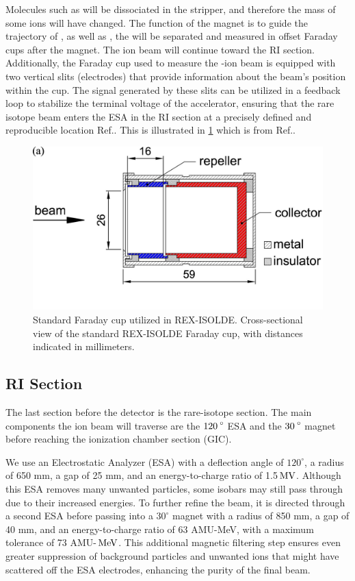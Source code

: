 Molecules such as  will be dissociated in the stripper, and therefore the mass of some ions will have changed. The function of the magnet is to guide the trajectory of , as well as , the  will be separated and measured in offset Faraday cups after the magnet. 
The ion beam will continue toward the RI section. Additionally, the Faraday cup used to measure the -ion beam is equipped with two vertical slits (electrodes) that provide information about the beam's position within the cup. The signal generated by these slits can be utilized in a feedback loop to stabilize the terminal voltage of the accelerator, ensuring that the rare isotope beam enters the ESA in the RI section at a precisely defined and reproducible location Ref.\cite{HVEE2013}. This is illustrated in \cref{faradaycupslits} which is from Ref.\cite{Kovalchuk2015}.

\begin{figure}[ht]
    \centering
    \includegraphics[width=\linewidth]{B/FCCERN.pdf}
    \caption{Standard Faraday cup utilized in REX-ISOLDE. Cross-sectional view of the standard REX-ISOLDE Faraday cup, with distances indicated in millimeters.}
    \label{faradaycupslits}
\end{figure}


\subsection{RI Section}
The last section before the detector is the rare-isotope section. The main components the ion beam will traverse are the $\ce{120^{\circ}}$ ESA and the $\ce{30^{\circ}}$  magnet before reaching the ionization chamber section (GIC).

We use an Electrostatic Analyzer (ESA) with a deflection angle of \(120^{\circ}\), a radius of 650 mm, a gap of 25 mm, and an energy-to-charge ratio of 1.5$\, \mathrm{MV}$. Although this ESA removes many unwanted particles, some isobars may still pass through due to their increased energies. To further refine the beam, it is directed through a second ESA before passing into a \(30^{\circ}\) magnet with a radius of 850 mm, a gap of 40 mm, and an energy-to-charge ratio of 63 AMU-MeV, with a maximum tolerance of 73 AMU-$\, \mathrm{MeV}$. This additional magnetic filtering step ensures even greater suppression of background particles and unwanted ions that might have scattered off the ESA electrodes, enhancing the purity of the final beam.


